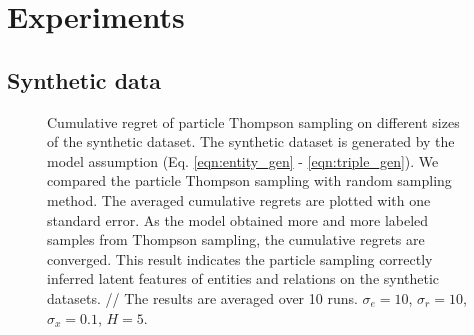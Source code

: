 \section{Experiments}
\subsection{Synthetic data}
\begin{figure}[t]
	\centering
	
	\caption{\label{fig:synthetic} Cumulative regret of particle Thompson sampling on different sizes of the synthetic dataset. The synthetic dataset is generated by the model assumption (Eq. \ref{eqn:entity_gen} - \ref{eqn:triple_gen}). We compared the particle Thompson sampling with random sampling method. The averaged cumulative regrets are plotted with one standard error. As the model obtained more and more labeled samples from Thompson sampling, the cumulative regrets are converged. This result  indicates the particle sampling correctly inferred latent features of entities and relations on the synthetic datasets. // The results are averaged over 10 runs. $\sigma_e = 10$, $\sigma_r=10$, $\sigma_x=0.1$, $H=5$.}
\end{figure}



